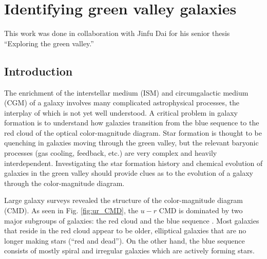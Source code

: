\chapter[Green valley galaxies]{Identifying green valley galaxies}

This work was done in collaboration with Jinfu Dai for his senior thesis 
``Exploring the green valley.''


\section{Introduction}

The enrichment of the interstellar medium (ISM) and circumgalactic medium (CGM) 
of a galaxy involves many complicated astrophysical processes, the interplay of 
which is not yet well understood.  A critical problem in galaxy formation is to 
understand how galaxies transition from the blue sequence to the red cloud of 
the optical color-magnitude diagram.  Star formation is thought to be quenching 
in galaxies moving through the green valley, but the relevant baryonic processes 
(gas cooling, feedback, etc.) are very complex and heavily interdependent.  
Investigating the star formation history and chemical evolution of galaxies in 
the green valley should provide clues as to the evolution of a galaxy through 
the color-magnitude diagram.



Large galaxy surveys \citep[like the Sloan Digital Sky Survey;][]{York00} 
revealed the structure of the color-magnitude diagram (CMD).  As seen in Fig. 
\ref{fig:ur_CMD}, the $u-r$ CMD is dominated by two major subgroups of galaxies: 
the red cloud and the blue sequence \citep{Strateva01, Baldry04}.  Most galaxies 
that reside in the red cloud appear to be older, elliptical galaxies that are no 
longer making stars (``red and dead'').  On the other hand, the blue sequence 
consists of mostly spiral and irregular galaxies which are actively forming stars.

